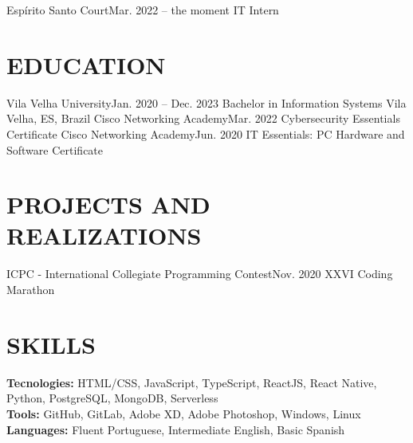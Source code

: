     \resumeSubheading
      {Espírito Santo Court}{Mar. 2022 -- the moment}
      {IT Intern}{}
      \resumeItemListStart
      \resumeItemListEnd

  \resumeSubHeadingListEnd

\section {EDUCATION}
  \resumeSubHeadingListStart
    \resumeSubheading
      {Vila Velha University}{Jan. 2020 -- Dec. 2023}
      {Bachelor in Information Systems}
      {Vila Velha, ES, Brazil}
  \resumeSubHeadingListEnd
  \resumeSubHeadingListStart
    \resumeSubheading
      {Cisco Networking Academy}{Mar. 2022}
      {Cybersecurity Essentials Certificate}{}
    \resumeSubheading
      {Cisco Networking Academy}{Jun. 2020}
      {IT Essentials: PC Hardware and Software  Certificate}{}
  \resumeSubHeadingListEnd


\section{PROJECTS AND REALIZATIONS}
    \resumeSubHeadingListStart
      \resumeSubheading
      {ICPC - International Collegiate Programming Contest}{Nov. 2020}
      {XXVI Coding Marathon}{}
          
    \resumeSubHeadingListEnd

\section{SKILLS}
 \begin{itemize}[leftmargin=0in, label={}]
    \small{\item{
     \textbf{Tecnologies:}
     {HTML/CSS, JavaScript, TypeScript, ReactJS, React Native, Python, PostgreSQL, MongoDB, Serverless}
     \vspace{2pt} \\
     
     \textbf{Tools:}
     {GitHub, GitLab, Adobe XD, Adobe Photoshop, Windows, Linux}
     \vspace{2pt} \\
     
     \textbf{Languages:}
     {Fluent Portuguese, Intermediate English, Basic Spanish}
    }}
 \end{itemize}
 